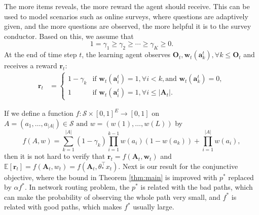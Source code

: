 \documentclass{article}
\newcommand{\EE}{\mathbb{E}}
\newcommand{\bA}{\mathbf{A}}
\newcommand{\ba}{\mathbf{a}}
\newcommand{\bO}{\mathbf{O}}
\newcommand{\br}{\mathbf{r}}
\newcommand{\bw}{\mathbf{w}}
\newcommand{\cS}{\mathcal{S}}
\newcommand{\abs}[1]{\left| #1 \right|}
\begin{document}
The more items reveals, the more reward the agent should receive. This can be used to model scenarios such as online surveys, where questions are adaptively given, and the more questions are observed, the more helpful it is to the survey conductor. Based on this, we assume that
$$
1 = \gamma_1 \geq \gamma_2 \geq \cdots \geq \gamma_K \geq 0.
$$
At the end of time step $t$, the learning agent observes $\bO_{t}, \bw_t(\ba_k^t), \forall k \leq \bO_{t}$ and receives a reward $\br_{t}$:
\begin{align*}
	\br_{t} %
	&=\begin{cases}
		1-\gamma_{k}  &\text{if } \bw_t(\ba_{i}^t) = 1, \forall i < k, \text{and } \bw_t(\ba_{k}^t) = 0,\\
		1 &\text{if } \bw_t(\ba_{i}^t) = 1, \forall i\leq \abs{\bA_t}.
	\end{cases}
\end{align*}

If we define a function $f : \cS \times [0,1]^E \to [0,1]$ on $A = (a_1, \ldots, a_{\abs{A}}) \in \cS \text{ and } w = (w(1), \ldots, w(L))$ by
\begin{equation}
	\label{eq:AndRewardFunc}
	f(A,w) = \sum_{k = 1}^{\abs{A}} (1 - \gamma_k) \prod_{i = 1}^{k - 1} w(a_i)(1 - w(a_k)) + \prod_{i=1}^{\abs{A}}w(a_i),
\end{equation}
then it is not hard to verify that $\br_{t} = f(\bA_t, \bw_t)$ and $\EE[\br_{t}] = f(\bA_t, w_t) = f(\bA_t, \theta_{\ast}^{\top}x_t)$. Next is our result for the conjunctive objective, where the bound in Theorem \ref{thm:main} is improved with $p^{\ast}$ replaced by $\alpha f^{\ast}$. In network routing problem, the $p^{\ast}$ is related with the bad paths, which can make the probability of observing the whole path very small, and $f^{\ast}$ is related with good paths, which makes $f^{\ast}$ usually large. 
\end{document}

